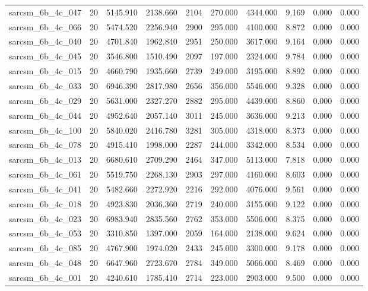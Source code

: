 \begin{tabular}{lrrrrrrrrr}
sarcsm\_6b\_4c\_047 & 20 & 5145.910 & 2138.660 & 2104 & 270.000 & 4344.000 & 9.169 & 0.000 & 0.000 \\
sarcsm\_6b\_4c\_066 & 20 & 5474.520 & 2256.940 & 2900 & 295.000 & 4100.000 & 8.872 & 0.000 & 0.000 \\
sarcsm\_6b\_4c\_040 & 20 & 4701.840 & 1962.840 & 2951 & 250.000 & 3617.000 & 9.164 & 0.000 & 0.000 \\
sarcsm\_6b\_4c\_045 & 20 & 3546.800 & 1510.490 & 2097 & 197.000 & 2324.000 & 9.784 & 0.000 & 0.000 \\
sarcsm\_6b\_4c\_015 & 20 & 4660.790 & 1935.660 & 2739 & 249.000 & 3195.000 & 8.892 & 0.000 & 0.000 \\
sarcsm\_6b\_4c\_033 & 20 & 6946.390 & 2817.980 & 2656 & 356.000 & 5546.000 & 9.328 & 0.000 & 0.000 \\
sarcsm\_6b\_4c\_029 & 20 & 5631.000 & 2327.270 & 2882 & 295.000 & 4439.000 & 8.860 & 0.000 & 0.000 \\
sarcsm\_6b\_4c\_044 & 20 & 4952.640 & 2057.140 & 3011 & 245.000 & 3636.000 & 9.213 & 0.000 & 0.000 \\
sarcsm\_6b\_4c\_100 & 20 & 5840.020 & 2416.780 & 3281 & 305.000 & 4318.000 & 8.373 & 0.000 & 0.000 \\
sarcsm\_6b\_4c\_078 & 20 & 4915.410 & 1998.000 & 2287 & 244.000 & 3342.000 & 8.534 & 0.000 & 0.000 \\
sarcsm\_6b\_4c\_013 & 20 & 6680.610 & 2709.290 & 2464 & 347.000 & 5113.000 & 7.818 & 0.000 & 0.000 \\
sarcsm\_6b\_4c\_061 & 20 & 5519.750 & 2268.130 & 2903 & 297.000 & 4160.000 & 8.603 & 0.000 & 0.000 \\
sarcsm\_6b\_4c\_041 & 20 & 5482.660 & 2272.920 & 2216 & 292.000 & 4076.000 & 9.561 & 0.000 & 0.000 \\
sarcsm\_6b\_4c\_018 & 20 & 4923.830 & 2036.360 & 2719 & 240.000 & 3155.000 & 9.122 & 0.000 & 0.000 \\
sarcsm\_6b\_4c\_023 & 20 & 6983.940 & 2835.560 & 2762 & 353.000 & 5506.000 & 8.375 & 0.000 & 0.000 \\
sarcsm\_6b\_4c\_053 & 20 & 3310.850 & 1397.000 & 2059 & 164.000 & 2138.000 & 9.624 & 0.000 & 0.000 \\
sarcsm\_6b\_4c\_085 & 20 & 4767.900 & 1974.020 & 2433 & 245.000 & 3300.000 & 9.178 & 0.000 & 0.000 \\
sarcsm\_6b\_4c\_048 & 20 & 6647.960 & 2723.670 & 2784 & 349.000 & 5066.000 & 8.469 & 0.000 & 0.000 \\
sarcsm\_6b\_4c\_001 & 20 & 4240.610 & 1785.410 & 2714 & 223.000 & 2903.000 & 9.500 & 0.000 & 0.000 \\

\end{tabular}

